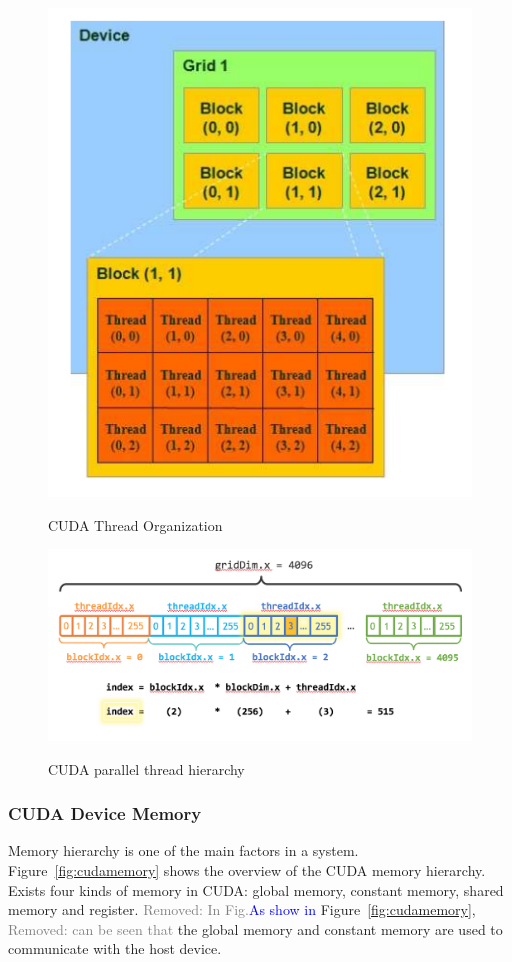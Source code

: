 \documentclass[Ingles]{ic-tese-v1}
\newcommand{\rem}[1]{\noindent\textcolor{gray}{Removed: {#1}}}
\newcommand{\new}[1]{\noindent\textcolor{blue}{ {#1}}}
\newcommand{\rem}[1]{}
\newcommand{\new}[1]{#1}
\newcommand{\rfig}[1]{Figure~\ref{fig:#1}}
\begin{document}
\begin{figure}[t]
	\centering
	\caption{CUDA Thread Organization}
	\includegraphics[scale=0.70]{images/thread_organization.png}
	\label{fig:threadorganization}
\end{figure}

\begin{figure}[t]
	\caption{CUDA parallel thread hierarchy}
	\centering
	\includegraphics[scale=0.60]{images/cuda_indexing.png}
	\label{fig:cudaindex}
\end{figure}

\subsubsection{CUDA Device Memory}
\label{CUDA Device Memory}
Memory hierarchy is one of the main factors in a system. \rfig{cudamemory} shows the overview of the CUDA memory hierarchy. Exists four kinds of memory in CUDA: global
memory, constant memory, shared memory and register. \rem{In Fig.}\new{As show in} \rfig{cudamemory}, \rem{can be seen that} the global memory and constant memory are used to communicate with the host device.\\
\end{document}
